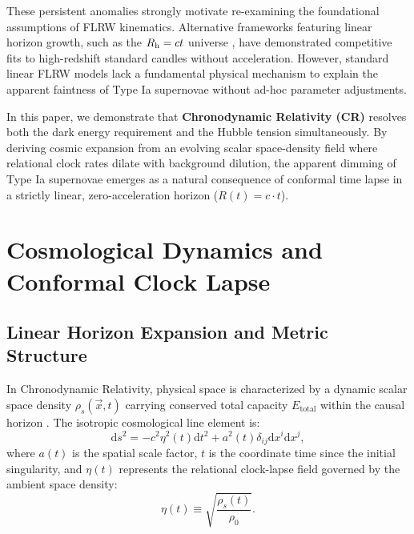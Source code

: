 \documentclass[aps,prd,reprint,superscriptaddress,nofootinbib,floatfix,amsmath,amssymb]{revtex4-2}
\begin{document}
These persistent anomalies strongly motivate re-examining the foundational assumptions of FLRW kinematics. Alternative frameworks featuring linear horizon growth, such as the $R_{\rm h} = ct$ universe \cite{Melia2012,Melia2018}, have demonstrated competitive fits to high-redshift standard candles without acceleration. However, standard linear FLRW models lack a fundamental physical mechanism to explain the apparent faintness of Type Ia supernovae without ad-hoc parameter adjustments.

In this paper, we demonstrate that \textbf{Chronodynamic Relativity (CR)} \cite{Shreve2026_Foundations} resolves both the dark energy requirement and the Hubble tension simultaneously. By deriving cosmic expansion from an evolving scalar space-density field where relational clock rates dilate with background dilution, the apparent dimming of Type Ia supernovae emerges as a natural consequence of conformal time lapse in a strictly linear, zero-acceleration horizon ($R(t) = c \cdot t$).

\section{Cosmological Dynamics and Conformal Clock Lapse}
\label{sec:cosmology}

\subsection{Linear Horizon Expansion and Metric Structure}

In Chronodynamic Relativity, physical space is characterized by a dynamic scalar space density $\rho_s(\vec{x}, t)$ carrying conserved total capacity $E_{\text{total}}$ within the causal horizon \cite{Shreve2026_Foundations}. The isotropic cosmological line element is:
\begin{equation}
\mathrm{d}s^2 = -c^2 \eta^2(t) \mathrm{d}t^2 + a^2(t) \delta_{ij} \mathrm{d}x^i \mathrm{d}x^j,
\label{eq:metric}
\end{equation}
where $a(t)$ is the spatial scale factor, $t$ is the coordinate time since the initial singularity, and $\eta(t)$ represents the relational clock-lapse field governed by the ambient space density:
\begin{equation}
\eta(t) \equiv \sqrt{\frac{\rho_s(t)}{\rho_0}}.
\label{eq:clock_lapse}
\end{equation}
\end{document}
